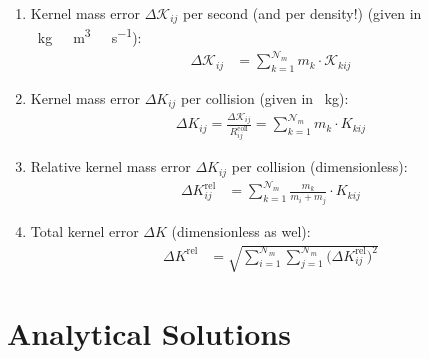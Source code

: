         \begin{enumerate}

            \item Kernel mass error $\Delta \mathcal K_{ij}$ per second (and per density!)
                (given in \SI{}{\kilogram\ \meter^3\ \second^{-1}}): 
                \begin{align}
                    \Delta \mathcal K_{ij}
                        &= \sum_{k=1}^{\mathcal N_m} m_k \cdot \mathcal K_{kij}
                \end{align}

            \item Kernel mass error $\Delta K_{ij}$ per collision 
                (given in \SI{}{\kilogram}): 
                \begin{align}
                    \Delta K_{ij}
                        = \frac{\Delta \mathcal K_{ij}}{R^\text{coll}_{ij}}
                        = \sum_{k=1}^{\mathcal N_m} m_k \cdot K_{kij}
                \end{align}

            \item Relative kernel mass error $\Delta K_{ij}$ per collision 
                (dimensionless):
                \begin{align}
                    \Delta K_{ij}^\text{rel} &= \sum_{k=1}^{\mathcal N_m} \frac{m_k}{m_i+m_j} \cdot K_{kij}
                \end{align}

            \item Total kernel error $\Delta K$
                (dimensionless as wel):
                \begin{align}
                    \Delta K^\text{rel} &= \sqrt{
                        \sum_{i=1}^{\mathcal N_m}
                        \sum_{j=1}^{\mathcal N_m}
                        \big(\Delta K_{ij}^\text{rel}\big)^2
                    }
                \end{align}

        \end{enumerate}



\newpage\section{Analytical Solutions}

